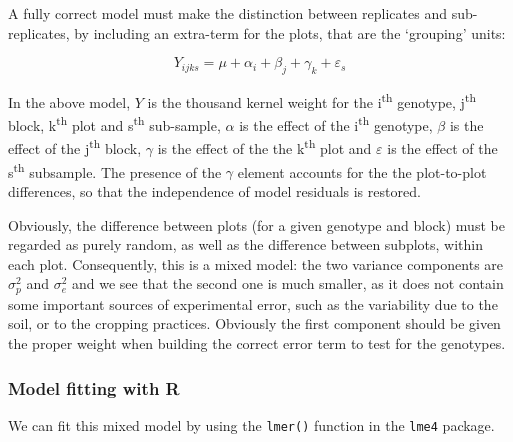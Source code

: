 \documentclass[a4paper,12pt,oneside]{book}
\begin{document}
A fully correct model must make the distinction between replicates and sub-replicates, by including an extra-term for the plots, that are the `grouping' units:

\[ Y_{ijks} = \mu + \alpha_i + \beta_j + \gamma_{k} + \varepsilon_{s}\]

In the above model, \(Y\) is the thousand kernel weight for the i\textsuperscript{th} genotype, j\textsuperscript{th} block, k\textsuperscript{th} plot and s\textsuperscript{th} sub-sample, \(\alpha\) is the effect of the i\textsuperscript{th} genotype, \(\beta\) is the effect of the j\textsuperscript{th} block, \(\gamma\) is the effect of the the k\textsuperscript{th} plot and \(\varepsilon\) is the effect of the s\textsuperscript{th} subsample. The presence of the \(\gamma\) element accounts for the the plot-to-plot differences, so that the independence of model residuals is restored.

Obviously, the difference between plots (for a given genotype and block) must be regarded as purely random, as well as the difference between subplots, within each plot. Consequently, this is a mixed model: the two variance components are \(\sigma^2_p\) and \(\sigma^2_e\) and we see that the second one is much smaller, as it does not contain some important sources of experimental error, such as the variability due to the soil, or to the cropping practices. Obviously the first component should be given the proper weight when building the correct error term to test for the genotypes.

\hypertarget{model-fitting-with-r-4}{%
\subsubsection{Model fitting with R}\label{model-fitting-with-r-4}}

We can fit this mixed model by using the \texttt{lmer()} function in the \texttt{lme4} package.
\end{document}
